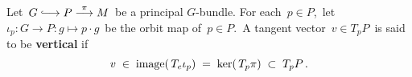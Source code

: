 
\vskip 0.5cm
\begin{definition}
\mbox{}
\vskip 0.1cm
\noindent
Let \,$G \longhookrightarrow P \overset{\pi}{\longrightarrow} M$\, be a principal $G$-bundle.
For each \,$p \in P$,\, let \,$\iota_{p} : G \longrightarrow P : g \longmapsto p \cdot g$\, be the orbit map of \,$p \in P$.\,
A tangent vector \,$v \in T_{p}P$\, is said to be \textbf{vertical} if
\begin{equation*}
v \;\in\; \textnormal{image}\!\left(\,T_{e}\iota_{p}\right) \;=\; \ker\!\left(\,T_{p}\pi\right) \;\subset\; T_{p}P\,.
\end{equation*}
\end{definition}



